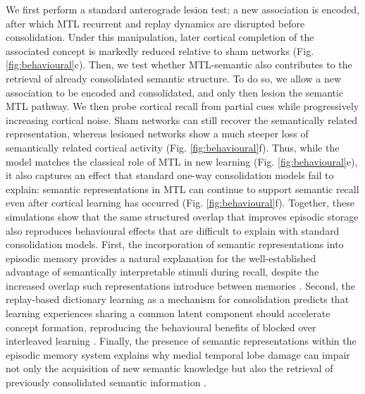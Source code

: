 \documentclass{article}
\begin{document}
We first perform a standard anterograde lesion test: a new association is encoded, after which MTL recurrent and replay dynamics are disrupted before consolidation. Under this manipulation, later cortical completion of the associated concept is markedly reduced relative to sham networks (Fig. \ref{fig:behavioural}c). Then, we test whether MTL-semantic also contributes to the retrieval of already consolidated semantic structure. To do so, we allow a new association to be encoded and consolidated, and only then lesion the semantic MTL pathway. We then probe cortical recall from partial cues while progressively increasing cortical noise. Sham networks can still recover the semantically related representation, whereas lesioned networks show a much steeper loss of semantically related cortical activity (Fig. \ref{fig:behavioural}f). Thus, while the model matches the classical role of MTL in new learning (Fig. \ref{fig:behavioural}e), it also captures an effect that standard one-way consolidation models fail to explain: semantic representations in MTL can continue to support semantic recall even after cortical learning has occurred (Fig. \ref{fig:behavioural}f).
\newline\newline
Together, these simulations show that the same structured overlap that improves episodic storage also reproduces behavioural effects that are difficult to explain with standard consolidation models. First, the incorporation of semantic representations into episodic memory provides a natural explanation for the well-established advantage of semantically interpretable stimuli during recall, despite the increased overlap such representations introduce between memories . Second, the replay-based dictionary learning as a mechanism for consolidation predicts that learning experiences sharing a common latent component should accelerate concept formation, reproducing the behavioural benefits of blocked over interleaved learning . Finally, the presence of semantic representations within the episodic memory system explains why medial temporal lobe damage can impair not only the acquisition of new semantic knowledge but also the retrieval of previously consolidated semantic information .
\end{document}
